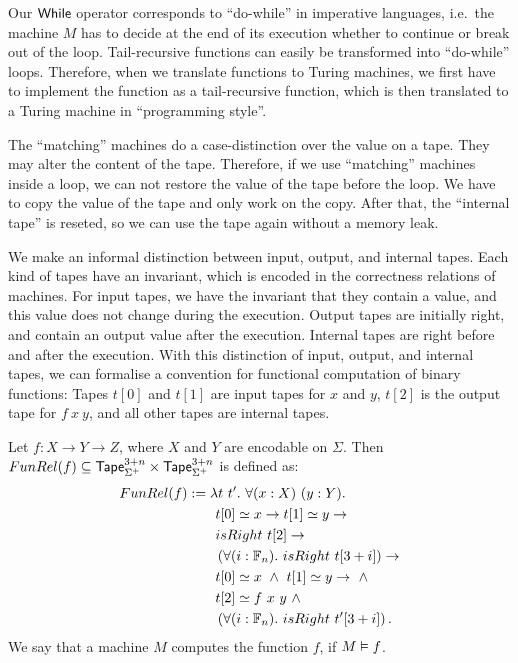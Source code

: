 Our $\mathsf{While}$ operator corresponds to ``do-while'' in imperative languages, i.e.\ the machine $M$ has to decide at the end of its execution whether to
continue or break out of the loop.  Tail-recursive functions can easily be transformed into ``do-while'' loops.  Therefore, when we translate
functions to Turing machines, we first have to implement the function as a tail-recursive function, which is then translated to a Turing machine in
``programming style''.

The ``matching'' machines do a case-distinction over the value on a tape.  They may alter the content of the tape.  Therefore, if we use ``matching''
machines inside a loop, we can not restore the value of the tape before the loop.  We have to copy the value of the tape and only work on the copy.
After that, the ``internal tape'' is reseted, so we can use the tape again without a memory leak.


We make an informal distinction between input, output, and internal tapes.  Each kind of tapes have an invariant, which is encoded in the correctness
relations of machines.  For input tapes, we have the invariant that they contain a value, and this value does not change during the execution.  Output
tapes are initially right, and contain an output value after the execution.  Internal tapes are right before and after the execution.  With this
distinction of input, output, and internal tapes, we can formalise a convention for functional computation of binary functions: Tapes $t[0]$ and
$t[1]$ are input tapes for $x$ and $y$, $t[2]$ is the output tape for $f~x~y$, and all other tapes are internal tapes.
\begin{definition}
  \label{def:Computes2_Rel}
  Let $f : X \to Y \to Z$, where $X$ and $Y$ are encodable on $\Sigma$.  Then
  $FunRel(f) \subseteq \mathsf{Tape}_{\Sigma^+}^{3+n} \times \mathsf{Tape}_{\Sigma^+}^{3+n}$ is defined as:
  \begin{alignat*}{2}
     FunRel(f) &:= \lambda t~t'.~\forall (x:X)~(y:Y). \\
    &\qquad t[0] \simeq x \rightarrow t[1] \simeq y \rightarrow \\
    &\qquad isRight~t[2] \rightarrow \\
    &\qquad \left(\forall (i:\mathbb{F}_n).~isRight~t[3+i] \right) \rightarrow \\
    &\qquad t[0] \simeq x ~\land~ t[1] \simeq y \rightarrow ~\land~ \\
    &\qquad t[2] \simeq f~x~y ~\land~ \\
    &\qquad \left(\forall (i:\mathbb{F}_n).~isRight~t'[3+i] \right).
  \end{alignat*}
  We say that a machine $M$ computes the function $f$, if $M \mathrel{\vDash} f$.
\end{definition}


